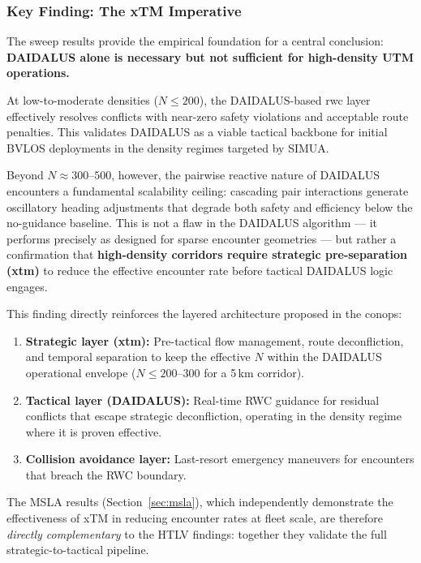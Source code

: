 \subsubsection{Key Finding: The xTM Imperative}
\label{sec:xtm_imperative}

The sweep results provide the empirical foundation for a central conclusion: \textbf{DAIDALUS
alone is necessary but not sufficient for high-density UTM operations.}

At low-to-moderate densities ($N \leq 200$), the DAIDALUS-based \gls{rwc} layer effectively
resolves conflicts with near-zero safety violations and acceptable route penalties. This
validates DAIDALUS as a viable tactical backbone for initial BVLOS deployments in the density
regimes targeted by SIMUA.

Beyond $N \approx 300$--$500$, however, the pairwise reactive nature of DAIDALUS encounters
a fundamental scalability ceiling: cascading pair interactions generate oscillatory
heading adjustments that degrade both safety and efficiency below the no-guidance baseline.
This is not a flaw in the DAIDALUS algorithm --- it performs precisely as designed for
sparse encounter geometries --- but rather a confirmation that \textbf{high-density
corridors require strategic pre-separation (\gls{xtm})} to reduce the effective encounter
rate before tactical DAIDALUS logic engages.

This finding directly reinforces the layered architecture proposed in the \gls{conops}:
\begin{enumerate}
    \item \textbf{Strategic layer (\gls{xtm}):} Pre-tactical flow management, route
    deconfliction, and temporal separation to keep the effective $N$ within the DAIDALUS
    operational envelope ($N \leq 200$--$300$ for a 5\,km corridor).
    \item \textbf{Tactical layer (DAIDALUS):} Real-time RWC guidance for residual conflicts
    that escape strategic deconfliction, operating in the density regime where it is proven
    effective.
    \item \textbf{Collision avoidance layer:} Last-resort emergency maneuvers for encounters
    that breach the RWC boundary.
\end{enumerate}

\noindent The MSLA results (Section~\ref{sec:msla}), which independently demonstrate
the effectiveness of xTM in reducing encounter rates at fleet scale, are therefore
\emph{directly complementary} to the HTLV findings: together they validate the full
strategic-to-tactical pipeline.

